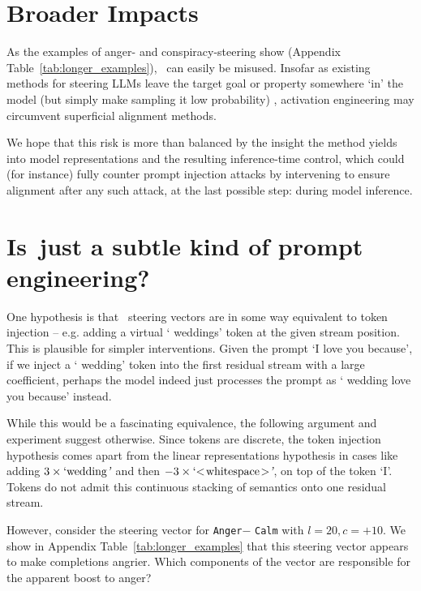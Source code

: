 \vspace{3mm}

\section{Broader Impacts}
\label{app:impact}
As the examples of anger- and conspiracy-steering show (Appendix Table~\ref{tab:longer_examples}), \shortmethod\, can easily be misused. Insofar as existing methods for steering LLMs leave the target goal or property somewhere `in' the model (but simply make sampling it low probability) \cite{lyu2024keeping}, activation engineering may circumvent superficial alignment methods.

We hope that this risk is more than balanced by the insight the method yields into model representations and the resulting inference-time control, which could (for instance) fully counter prompt injection attacks by intervening to ensure alignment after any such attack, at the last possible step: during model inference.


\section{Is \shortmethod\,just a subtle kind of prompt engineering?}
\label{app:prompteng}
One hypothesis is that \shortmethod\, steering vectors are in some way equivalent to token injection -- e.g. adding a virtual ` weddings' token at the given stream position. This is plausible for simpler interventions. Given the prompt `I love you because', if we inject a ` wedding' token into the first residual stream with a large coefficient, perhaps the model indeed just processes the prompt as ` wedding love you because' instead.

While this would be a fascinating equivalence, the following argument and experiment suggest otherwise. Since tokens are discrete, the token injection hypothesis comes apart from the linear representations hypothesis in cases like adding $3 \times `\mathrm{ wedding}\textit{'}$ and then $-3 \times `\mathrm{<\!whitespace\!>}\textit{'}$, on top of the token `I'. Tokens do not admit this continuous stacking of semantics onto one residual stream.

However, consider the steering vector for \texttt{Anger}$-$ \texttt{Calm} with $l=20, c= +10$. We show in Appendix Table~\ref{tab:longer_examples} that this steering vector appears to make completions angrier. Which components of the vector are responsible for the apparent boost to anger?

